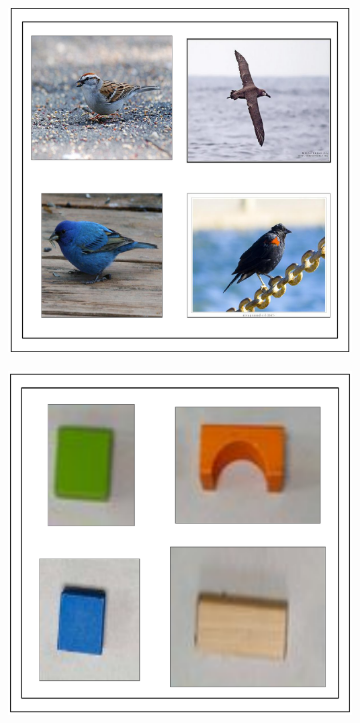 \begin{figure}[]
  \centering
\begin{subfigure}{0.25\textwidth}
\includegraphics[width=\textwidth]{figures/Figure_3A.pdf}
\end{subfigure}
\hspace{0.04\textwidth}
\begin{subfigure}{0.25\textwidth}
\includegraphics[width=\textwidth]{figures/Figure_3B.pdf}

\end{subfigure}
\end{figure}
